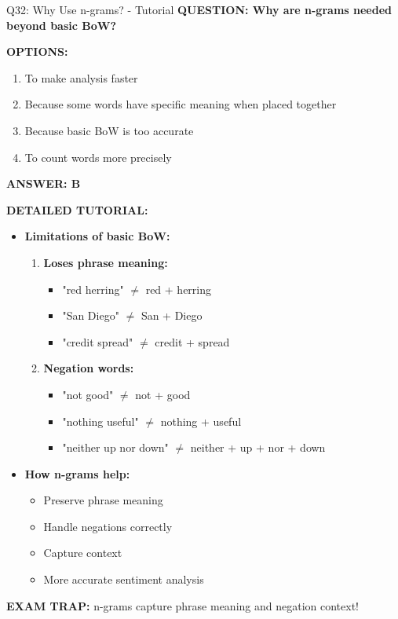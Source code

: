 \documentclass[8pt]{beamer}
\begin{document}
	\begin{frame}{Q32: Why Use n-grams? - Tutorial}
		\fontsize{6.5}{7.5}\selectfont
		\textbf{QUESTION: Why are n-grams needed beyond basic BoW?}
		
		\vspace{0.1cm}
		\textbf{OPTIONS:}
		\begin{enumerate}
			\item To make analysis faster
			\item Because some words have specific meaning when placed together
			\item Because basic BoW is too accurate
			\item To count words more precisely
		\end{enumerate}
		
		\vspace{0.1cm}
		\textcolor{myblue}{\textbf{ANSWER: B}}
		
		\vspace{0.1cm}
		\textbf{DETAILED TUTORIAL:}
		\begin{itemize}
			\item \textbf{Limitations of basic BoW:}
			\begin{enumerate}
				\item \textbf{Loses phrase meaning:}
				\begin{itemize}
					\item "red herring" $\neq$ red + herring
					\item "San Diego" $\neq$ San + Diego
					\item "credit spread" $\neq$ credit + spread
				\end{itemize}
				\item \textbf{Negation words:}
				\begin{itemize}
					\item "not good" $\neq$ not + good
					\item "nothing useful" $\neq$ nothing + useful
					\item "neither up nor down" $\neq$ neither + up + nor + down
				\end{itemize}
			\end{enumerate}
			\item \textbf{How n-grams help:}
			\begin{itemize}
				\item Preserve phrase meaning
				\item Handle negations correctly
				\item Capture context
				\item More accurate sentiment analysis
			\end{itemize}
		\end{itemize}
		
		\textcolor{myred}{\textbf{EXAM TRAP:}} n-grams capture \textcolor{myblue}{phrase meaning and negation context}!
	\end{frame}
	
\end{document}
